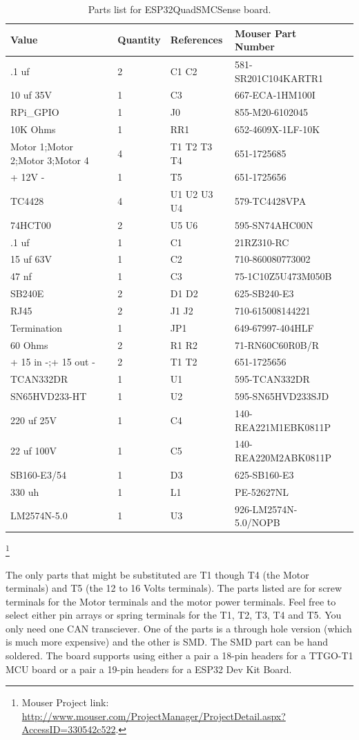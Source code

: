 \begin{table}[htdp]
\begin{centering}\begin{tabular}{|l|l|p{1in}|l|p{.5in}|}
\hline
Value&Quantity&References&Mouser Part Number \\
\hline
.1 uf&2&C1 C2&581-SR201C104KARTR1 \\
\hline
10 uf 35V&1&C3&667-ECA-1HM100I \\
\hline
RPi\_GPIO&1&J0&855-M20-6102045 \\
\hline
10K Ohms&1&RR1&652-4609X-1LF-10K \\
\hline
Motor 1;Motor 2;Motor 3;Motor 4&4&T1 T2 T3 T4&651-1725685 \\
\hline
+ 12V -&1&T5&651-1725656 \\
\hline
TC4428&4&U1 U2 U3 U4&579-TC4428VPA \\
\hline
74HCT00&2&U5 U6&595-SN74AHC00N \\
\hline
.1 uf&1&C1&21RZ310-RC\\
\hline
15 uf 63V&1&C2&710-860080773002\\
\hline
47 nf&1&C3&75-1C10Z5U473M050B\\
\hline
SB240E&2&D1 D2&625-SB240-E3\\
\hline
RJ45&2&J1 J2&710-615008144221\\
\hline
Termination&1&JP1&649-67997-404HLF\\
\hline
60 Ohms&2&R1 R2&71-RN60C60R0B/R\\
\hline
+ 15 in -;+ 15 out -&2&T1 T2&651-1725656\\
\hline
TCAN332DR&1&U1&595-TCAN332DR\\
\hline
SN65HVD233-HT&1&U2&595-SN65HVD233SJD\\
\hline
220 uf 25V&1&C4&140-REA221M1EBK0811P\\
\hline
22 uf 100V&1&C5&140-REA220M2ABK0811P\\
\hline
SB160-E3/54&1&D3&625-SB160-E3\\
\hline
330 uh&1&L1&PE-52627NL\\
\hline
LM2574N-5.0&1&U3&926-LM2574N-5.0/NOPB\\
\hline
\end{tabular}
\caption{Parts list for ESP32QuadSMCSense board.}
\end{centering}\end{table}\footnote{Mouser Project link: 
\url{http://www.mouser.com/ProjectManager/ProjectDetail.aspx?AccessID=330542c522}.}


The only parts that might be substituted are T1 though T4 (the Motor
terminals) and T5 (the 12 to 16 Volts terminals). The parts listed are for
screw terminals for the Motor terminals and the motor power terminals. Feel
free to select either pin arrays or spring terminals for the T1, T2, T3, T4
and T5. You only need one CAN transciever. One of the parts is a through hole
version (which is much more expensive) and the other is SMD. The SMD part can
be hand soldered. The board supports using either a pair a 18-pin headers for
a TTGO-T1 MCU board or a pair a 19-pin headers for a ESP32 Dev Kit Board.

